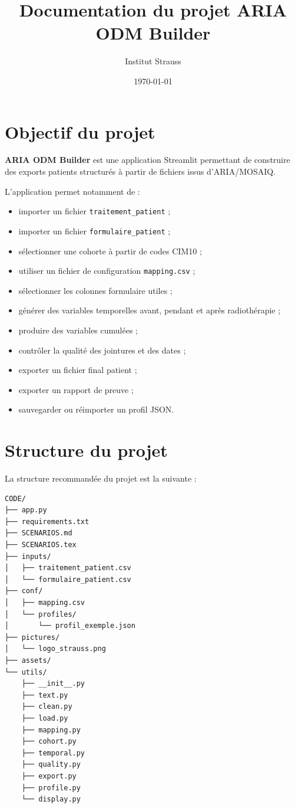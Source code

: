 \documentclass[11pt,a4paper]{article}
\title{\textbf{Documentation du projet ARIA ODM Builder}}
\author{Institut Strauss}
\date{\today}
\begin{document}
\maketitle

\tableofcontents
\newpage

\section{Objectif du projet}

\textbf{ARIA ODM Builder} est une application Streamlit permettant de construire
des exports patients structurés à partir de fichiers issus d'ARIA/MOSAIQ.

L'application permet notamment de :

\begin{itemize}
    \item importer un fichier \texttt{traitement\_patient} ;
    \item importer un fichier \texttt{formulaire\_patient} ;
    \item sélectionner une cohorte à partir de codes CIM10 ;
    \item utiliser un fichier de configuration \texttt{mapping.csv} ;
    \item sélectionner les colonnes formulaire utiles ;
    \item générer des variables temporelles avant, pendant et après radiothérapie ;
    \item produire des variables cumulées ;
    \item contrôler la qualité des jointures et des dates ;
    \item exporter un fichier final patient ;
    \item exporter un rapport de preuve ;
    \item sauvegarder ou réimporter un profil JSON.
\end{itemize}

\section{Structure du projet}

La structure recommandée du projet est la suivante :

\begin{lstlisting}
CODE/
├── app.py
├── requirements.txt
├── SCENARIOS.md
├── SCENARIOS.tex
├── inputs/
│   ├── traitement_patient.csv
│   └── formulaire_patient.csv
├── conf/
│   ├── mapping.csv
│   └── profiles/
│       └── profil_exemple.json
├── pictures/
│   └── logo_strauss.png
├── assets/
└── utils/
    ├── __init__.py
    ├── text.py
    ├── clean.py
    ├── load.py
    ├── mapping.py
    ├── cohort.py
    ├── temporal.py
    ├── quality.py
    ├── export.py
    ├── profile.py
    └── display.py
\end{lstlisting}
\end{document}
